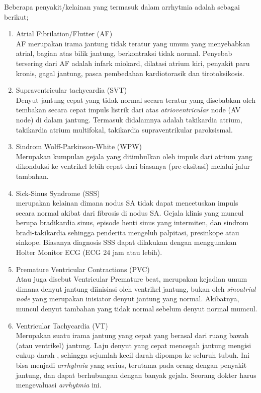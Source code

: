 Beberapa penyakit/kelainan yang termasuk dalam \gls{arrhytmia} adalah sebagai
berikut;
\begin{enumerate}
  \item Atrial Fibrilation/Flutter (AF) \\
  AF merupakan irama jantung tidak teratur yang umum yang menyebabkan atrial,
  bagian atas bilik jantung, berkontraksi tidak normal. Penyebab tersering dari
  AF adalah infark miokard, dilatasi atrium kiri, penyakit paru kronis, gagal
  jantung, pasca pembedahan kardiotorasik dan tirotoksikosis.
  
  \item Supraventricular tachycardia (SVT) \\
  Denyut jantung cepat yang	tidak  normal secara teratur yang disebabkan oleh
  tembakan secara cepat impuls listrik  dari atas \textit{atrioventricular} node
  (AV node) di dalam jantung. Termasuk didalamnya adalah takikardia atrium,
  takikardia atrium multifokal, takikardia supraventrikular paroksismal.

  \item Sindrom Wolff-Parkinson-White (WPW) \\
  Merupakan kumpulan gejala yang ditimbulkan oleh impuls dari atrium yang
  dikonduksi ke ventrikel lebih cepat dari biasanya (pre-eksitasi) melalui jalur
  tambahan.

  \item Sick-Sinus Syndrome (SSS) \\
  merupakan kelainan dimana nodus SA tidak dapat mencetuskan impuls secara
  normal akibat dari fibrosis di nodus SA. Gejala klinis yang muncul berupa
  bradikardia sinus, episode henti sinus yang intermiten, dan sindrom
  bradi-takikardia sehingga penderita mengeluh palpitasi, presinkope atau
  sinkope. Biasanya diagnosis SSS dapat dilakukan dengan menggunakan Holter
  Monitor ECG (ECG 24 jam atau lebih).
  
  \item Premature Ventricular Contractions (PVC) \\
  Atau juga disebut Ventricular Premature beat, merupakan kejadian umum  dimana
  denyut jantung diinisiasi oleh ventrikel jantung,   bukan  oleh
  \textit{sinoatrial node} yang merupakan  inisiator denyut jantung yang normal.
  Akibatnya, muncul denyut tambahan yang tidak normal sebelum denyut normal
  mumcul.

  \item Ventricular Tachycardia (VT) \\
  Merupakan suatu irama jantung yang cepat yang berasal dari ruang bawah (atau
  ventrikel) jantung. Laju denyut yang cepat mencegah jantung mengisi cukup
  darah , sehingga sejumlah kecil darah dipompa ke seluruh tubuh. Ini bisa
  menjadi \textit{arrhytmia} yang serius,  terutama pada orang dengan penyakit
  jantung, dan dapat berhubungan dengan banyak  gejala. Seorang dokter harus
  mengevaluasi \textit{arrhytmia} ini.
		

\end{enumerate}

